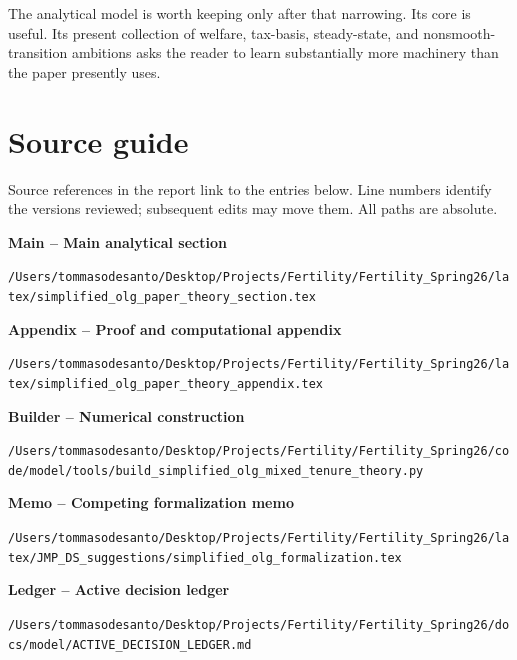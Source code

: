 \documentclass[11pt,letterpaper]{article}
\begin{document}
The analytical model is worth keeping only after that narrowing. Its core is useful. Its
present collection of welfare, tax-basis, steady-state, and nonsmooth-transition ambitions
asks the reader to learn substantially more machinery than the paper presently uses.

\clearpage
\appendix
\section{Source guide}
Source references in the report link to the entries below. Line numbers identify the versions reviewed; subsequent edits may move them. All paths are absolute.

\hypertarget{source-main}{\textbf{Main -- Main analytical section}}\par
{\small\nolinkurl{/Users/tommasodesanto/Desktop/Projects/Fertility/Fertility_Spring26/latex/simplified_olg_paper_theory_section.tex}}\par
\vspace{0.35em}

\hypertarget{source-appendix}{\textbf{Appendix -- Proof and computational appendix}}\par
{\small\nolinkurl{/Users/tommasodesanto/Desktop/Projects/Fertility/Fertility_Spring26/latex/simplified_olg_paper_theory_appendix.tex}}\par
\vspace{0.35em}

\hypertarget{source-builder}{\textbf{Builder -- Numerical construction}}\par
{\small\nolinkurl{/Users/tommasodesanto/Desktop/Projects/Fertility/Fertility_Spring26/code/model/tools/build_simplified_olg_mixed_tenure_theory.py}}\par
\vspace{0.35em}

\hypertarget{source-memo}{\textbf{Memo -- Competing formalization memo}}\par
{\small\nolinkurl{/Users/tommasodesanto/Desktop/Projects/Fertility/Fertility_Spring26/latex/JMP_DS_suggestions/simplified_olg_formalization.tex}}\par
\vspace{0.35em}

\hypertarget{source-ledger}{\textbf{Ledger -- Active decision ledger}}\par
{\small\nolinkurl{/Users/tommasodesanto/Desktop/Projects/Fertility/Fertility_Spring26/docs/model/ACTIVE_DECISION_LEDGER.md}}\par
\vspace{0.35em}
\end{document}
